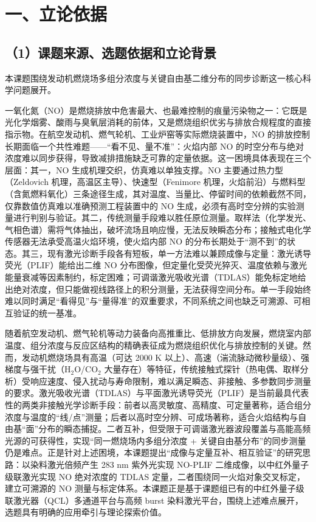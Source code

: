 
\chapter{一、立论依据}

\section{（1）课题来源、选题依据和立论背景}

本课题围绕发动机燃烧场多组分浓度与关键自由基二维分布的同步诊断这一核心科学问题展开。

一氧化氮（NO）是燃烧排放中危害最大、也最难控制的痕量污染物之一：它既是光化学烟雾、酸雨与臭氧层消耗的前体，又是燃烧组织优劣与排放合规程度的直接指示物。在航空发动机、燃气轮机、工业炉窑等实际燃烧装置中，NO 的排放控制长期面临一个共性难题——``看不见、量不准''：火焰内部 NO 的时空分布与绝对浓度难以同步获得，导致减排措施缺乏可靠的定量依据。这一困境具体表现在三个层面：其一，NO 生成机理交织，仿真难以单独支撑。NO 主要通过热力型（Zeldovich 机理，高温区主导）、快速型（Fenimore 机理，火焰前沿）与燃料型（含氮燃料氧化）三条途径生成，其对温度、当量比、停留时间的依赖截然不同，仅靠数值仿真难以准确预测工程装置中的 NO 生成，必须有高时空分辨的实验测量进行判别与验证。其二，传统测量手段难以胜任原位测量。取样法（化学发光、气相色谱）需将气体抽出，破坏流场且响应慢，无法反映瞬态分布；接触式电化学传感器无法承受高温火焰环境，使火焰内部 NO 的分布长期处于``测不到''的状态。其三，现有激光诊断手段各有短板，单一方法难以兼顾成像与定量：激光诱导荧光（PLIF）能给出二维 NO 分布图像，但定量化受荧光猝灭、温度依赖与激光能量衰减等因素制约，标定困难；可调谐激光吸收光谱（TDLAS）能免标定地给出绝对浓度，但只能做视线路径上的积分测量，无法获得空间分布。单一手段始终难以同时满足``看得见''与``量得准''的双重要求，不同系统之间也缺乏可溯源、可相互验证的统一基准。

随着航空发动机、燃气轮机等动力装备向高推重比、低排放方向发展，燃烧室内部温度、组分浓度与反应区结构的精确表征成为燃烧组织优化与排放控制的关键。然而，发动机燃烧场具有高温（可达 2000 K 以上）、高速（湍流脉动微秒量级）、强梯度与强干扰（H$_2$O/CO$_2$ 大量存在）等特征，传统接触式探针（热电偶、取样分析）受响应速度、侵入扰动与寿命限制，难以满足瞬态、非接触、多参数同步测量的要求。激光吸收光谱（TDLAS）与平面激光诱导荧光（PLIF）是当前最具代表性的两类非接触光学诊断手段：前者以高灵敏度、高精度、可定量著称，适合组分浓度与温度的``线/点''测量；后者以高时空分辨、可成场著称，适合火焰结构与自由基``面''分布的瞬态捕捉。二者互补，但受限于可调谐激光器波段覆盖与高能高频光源的可获得性，实现``同一燃烧场内多组分浓度 + 关键自由基分布''的同步测量仍是难点。正是针对上述困境，本课题提出``成像与定量互补、相互验证''的研究思路：以染料激光倍频产生 283 nm 紫外光实现 NO-PLIF 二维成像，以中红外量子级联激光实现 NO 绝对浓度的 TDLAS 定量，二者围绕同一火焰对象交叉标定，建立可溯源的 NO 测量与标定体系。本课题正是基于课题组已有的中红外量子级联激光器（QCL）多通道平台与高频 burst 染料激光平台，围绕上述难点展开，选题具有明确的应用牵引与理论探索价值。

